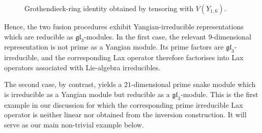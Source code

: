 \documentclass[12pt,reqno]{amsart}
\numberwithin{equation}{section}
\begin{document}
\begin{figure}[htbp]
	
	\caption{
		Grothendieck-ring identity obtained by tensoring with $V(Y_{1,6})$.
	}
	\label{fig:tensoring_L(Y_{1,6})}
	
\end{figure}
Hence, the two fusion procedures exhibit Yangian-irreducible representations which are reducible as $\mathfrak{gl}_3$-modules. In the first case, the relevant $9$-dimensional representation is not prime as a Yangian module. Its prime factors are $\mathfrak{gl}_3$-irreducible, and the corresponding Lax operator therefore factorises into Lax operators associated with Lie-algebra irreducibles.

The second case, by contrast, yields a $21$-dimensional prime snake module which is irreducible as a Yangian module but reducible as a $\mathfrak{gl}_3$-module. This is the first example in our discussion for which the corresponding prime irreducible Lax operator is neither linear nor obtained from the inversion construction. It will serve as our main non-trivial example below.


	
\end{document}
